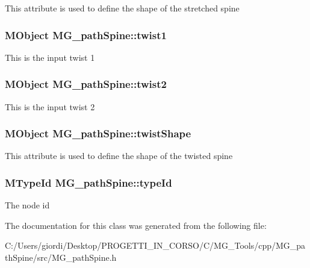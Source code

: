 This attribute is used to define the shape of the stretched spine \hypertarget{class_m_g__path_spine_a3a8e37960ae8c40d2bf7cfe45ffcaaa6}{
\subsubsection[{twist1}]{\setlength{\rightskip}{0pt plus 5cm}M\-Object M\-G\-\_\-path\-Spine\-::twist1\hspace{0.3cm}{\ttfamily [static]}}}\label{class_m_g__path_spine_a3a8e37960ae8c40d2bf7cfe45ffcaaa6}
This is the input twist 1 \hypertarget{class_m_g__path_spine_a2558520e0fa84c73b1c52cfb9268ecab}{
\subsubsection[{twist2}]{\setlength{\rightskip}{0pt plus 5cm}M\-Object M\-G\-\_\-path\-Spine\-::twist2\hspace{0.3cm}{\ttfamily [static]}}}\label{class_m_g__path_spine_a2558520e0fa84c73b1c52cfb9268ecab}
This is the input twist 2 \hypertarget{class_m_g__path_spine_a89a8f6f283deb9da030ed711a78c1b3b}{
\subsubsection[{twist\-Shape}]{\setlength{\rightskip}{0pt plus 5cm}M\-Object M\-G\-\_\-path\-Spine\-::twist\-Shape\hspace{0.3cm}{\ttfamily [static]}}}\label{class_m_g__path_spine_a89a8f6f283deb9da030ed711a78c1b3b}
This attribute is used to define the shape of the twisted spine \hypertarget{class_m_g__path_spine_a151a6bc4963051bb3ceb6cd45b5e51fc}{
\subsubsection[{type\-Id}]{\setlength{\rightskip}{0pt plus 5cm}M\-Type\-Id M\-G\-\_\-path\-Spine\-::type\-Id\hspace{0.3cm}{\ttfamily [static]}}}\label{class_m_g__path_spine_a151a6bc4963051bb3ceb6cd45b5e51fc}
The node id 

The documentation for this class was generated from the following file\-:\begin{DoxyCompactItemize}
\item 
C\-:/\-Users/giordi/\-Desktop/\-P\-R\-O\-G\-E\-T\-T\-I\-\_\-\-I\-N\-\_\-\-C\-O\-R\-S\-O/\-C/\-M\-G\-\_\-\-Tools/cpp/\-M\-G\-\_\-path\-Spine/src/M\-G\-\_\-path\-Spine.\-h\end{DoxyCompactItemize}
